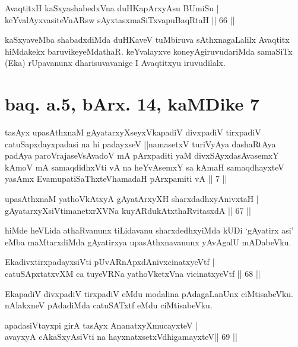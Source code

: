 \begin{shl}
AvaqtitxH kaSxyashabedxVna duHKapArxyAsu BUmiSu | \\
keYvalAyxvasiteVnARsw sAyxtasxmaSiTxvapuBaqRtaH \hfill||  66 || 
\end{shl}

\begin{artha} 
kaSxyaveMba shabadxdiMda duHKaveV tuMbiruva sAthxnagaLalilx Avaqtitx 
hiMdakekx baruvikeyeMdathaR. keYvalayxve koneyAgiruvudariMda samaSiTx 
(Eka) rUpavanunx dharisuvavanige I Avaqtitxyu iruvudilalx.
\end{artha}

\section*{baq. a.5, bArx. 14, kaMDike 7}

\begin{shl}
tasAyx upasAthxnaM gAyatarxyXseyxVkapadiV divxpadiV tirxpadiV catuSapxdayxpadasi na hi padayxseV ||namasetxV turiVyAya dashaRtAya padAya paroVrajaseV\s sAvadoV mA pArxpaditi yaM divxSAyxdasAvasemxY kAmoV mA samaqdidhxVti vA na heYvAsemxY sa kAmaH samaqdhayxteV yasAmx EvamupatiSaThxteV\s hamadaH pArxpamiti vA || 7 ||
\end{shl}

\begin{shl}
upasAthxnaM yathoVkAtxyA gAyatArxyXH sharxdadhxyA\s nivxtaH | \\
gAyatarxyXsiVtimanetxrXVNa kuyARdukAtxthaRvitasxdA \hfill||  67 || 
\end{shl}

\begin{artha} 
hiMde heVLida athaRvanunx tiLidavanu sharxdedhxyiMda kUDi `gAyatirx 
asi' eMba maMtarxdiMda gAyatirxya upasAthxnavanunx yAvAgalU mADabeVku.
\end{artha}

\begin{shl}
EkadivxtirxpadayxsiVti pUvARnApxdAnivxcinatxyeVtf  | \\
catuSApxtatxvXM ca tuyeVRNa yathoVketxVna vicinatxyeVtf \hfill||  68 || 
\end{shl}

\begin{artha} 
EkapadiV divxpadiV tirxpadiV eMdu modalina pAdagaLanUnx ciMtisabeVku. 
nAlakxneV pAdadiMda catuSATxtf eMdu ciMtisabeVku.
\end{artha}

\begin{shl}
apadasiVtayxpi girA tasAyx AnanatxyXmucayxteV  | \\
avayxyA cAkaSxyA\s siVti na hayxnatxsetxV\s dhigamayxteV\hfill ||  69 || 
\end{shl}

